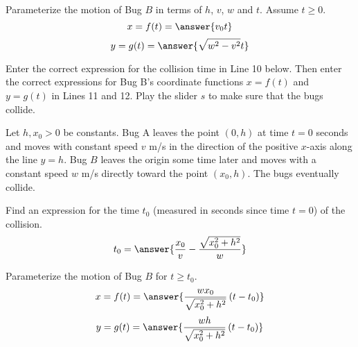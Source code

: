 \documentclass{ximera}
\begin{document}
\begin{question}
Parameterize the motion of Bug $B$ in terms of $h$, $v$, $w$ and $t$. Assume $t\geq 0$.
\[
        x = f(t)   =  \answer{v_0 t}
\]
\[
      y = g(t) = \answer{\sqrt{w^2-v^2}t}
\]
    \end{question}

\begin{exploration}\label{exp:pc1c}
Enter the correct expression for the collision time in Line 10 below. Then enter the correct expressions for Bug B's coordinate functions $x=f(t)$ and $y=g(t)$ in Lines 11 and 12. Play the slider $s$ to make sure that the bugs collide.

 
\begin{onlineOnly}
    \begin{center}
\end{center}
\end{onlineOnly}
\end{exploration}



 Let $h,x_0>0$ be constants. Bug A leaves the point $(0,h)$ at time $t=0$ seconds and moves with constant speed $v$ m/s in the direction of the positive $x$-axis along the line $y=h$. Bug $B$ leaves the origin some time later and moves with a constant speed $w$ m/s directly toward the point $(x_0,h)$. The bugs eventually collide.

\begin{question}
 Find an expression for the time $t_0$ (measured in seconds since time $t=0$) of the collision. %
\[
        t_0   =  \answer{\frac{x_0}{v} - \frac{\sqrt{x_0^2+h^2}}{w}}
\]
    \end{question}


\begin{question}
Parameterize the motion of Bug $B$ for $t\geq t_0$.
\[
        x = f(t)   =  \answer{\frac{wx_0}{\sqrt{x_0^2+h^2}}\left( t - t_0  \right)}
\]
\[
      y = g(t) =  \answer{\frac{wh}{\sqrt{x_0^2+h^2}}\left( t - t_0  \right)}
\]
    \end{question}
\end{document}
